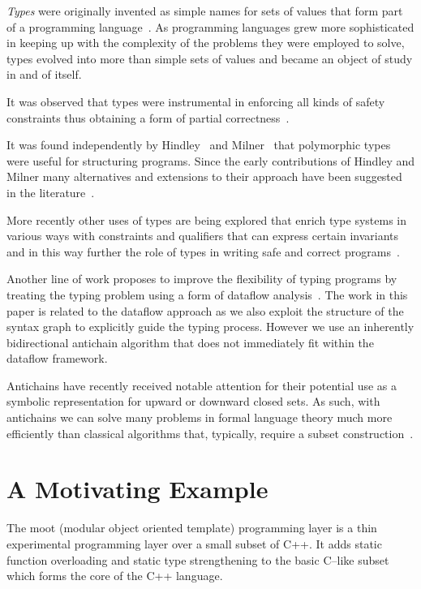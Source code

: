 \documentclass{sigplanconf}
\newcommand{\concept}[1]{\emph{#1}}
\begin{document}
\concept{Types} were originally invented as simple names for sets of
values that form part of a programming language~\cite{Naur1963}. As
programming languages grew more sophisticated in keeping up with the
complexity of the problems they were employed to solve, types evolved
into more than simple sets of values and became an object of study in
and of itself. 

It was observed that types were instrumental in enforcing all kinds of
safety constraints thus obtaining a form of partial
correctness~\cite{Middleton1977,Cardelli1985}.

It was found independently by Hindley~\cite{Hindley1969} and
Milner~\cite{Milner1978} that polymorphic types were useful for
structuring programs.  Since the early contributions of Hindley and
Milner many alternatives and extensions to their approach have been
suggested in the literature~\cite{Schwartz1975,Schonberg1981,Palsberg1992,Aiken1993,Eifrig1995,Aiken1997}.

More recently other uses of types are being explored that enrich type
systems in various ways with constraints and qualifiers that can
express certain invariants and in this way further the role of types
in writing safe and correct programs~\cite{Foster2006,Nystrom2008}.

Another line of work proposes to improve the flexibility of typing
programs by treating the typing problem using a form of dataflow
analysis~\cite{Tenenbaum1974,Kaplan1980,Khedker2003}.
The work in this paper is related to the dataflow approach as we also
exploit the structure of the syntax graph to explicitly guide the
typing process. However we use an inherently bidirectional antichain
algorithm that does not immediately fit within the dataflow framework.

Antichains have recently received notable attention for their
potential use as a symbolic representation for upward or downward
closed sets. As such, with antichains we can solve many problems in
formal language theory much more efficiently than classical algorithms
that, typically, require a subset
construction~\cite{wulf_antichains:_2006}.

\section{A Motivating Example}\label{sec:motivating}

The {\sc moot} (modular object oriented template) programming layer is
a thin experimental programming layer over a small subset of C++. It
adds static function overloading and static type strengthening to the
basic C--like subset which forms the core of the C++ language.
\end{document}
